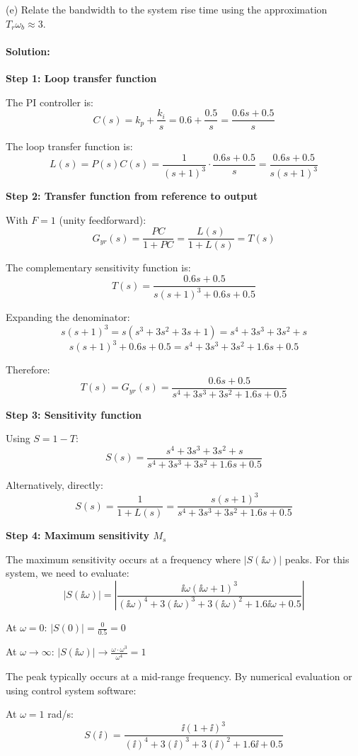 \documentclass[11pt,a4paper]{article}
\begin{document}
(e) Relate the bandwidth to the system rise time using the approximation $T_r \omega_b \approx 3$.

\paragraph{Solution:}

\textbf{Step 1: Loop transfer function}

The PI controller is:
\[
C(s) = k_p + \frac{k_i}{s} = 0.6 + \frac{0.5}{s} = \frac{0.6s + 0.5}{s}
\]

The loop transfer function is:
\[
L(s) = P(s)C(s) = \frac{1}{(s+1)^3} \cdot \frac{0.6s + 0.5}{s} = \frac{0.6s + 0.5}{s(s+1)^3}
\]

\textbf{Step 2: Transfer function from reference to output}

With $F = 1$ (unity feedforward):
\[
G_{yr}(s) = \frac{PC}{1+PC} = \frac{L(s)}{1+L(s)} = T(s)
\]

The complementary sensitivity function is:
\[
T(s) = \frac{0.6s + 0.5}{s(s+1)^3 + 0.6s + 0.5}
\]

Expanding the denominator:
\[
s(s+1)^3 = s(s^3 + 3s^2 + 3s + 1) = s^4 + 3s^3 + 3s^2 + s
\]
\[
s(s+1)^3 + 0.6s + 0.5 = s^4 + 3s^3 + 3s^2 + 1.6s + 0.5
\]

Therefore:
\[
T(s) = G_{yr}(s) = \frac{0.6s + 0.5}{s^4 + 3s^3 + 3s^2 + 1.6s + 0.5}
\]

\textbf{Step 3: Sensitivity function}

Using $S = 1 - T$:
\[
S(s) = \frac{s^4 + 3s^3 + 3s^2 + s}{s^4 + 3s^3 + 3s^2 + 1.6s + 0.5}
\]

Alternatively, directly:
\[
S(s) = \frac{1}{1+L(s)} = \frac{s(s+1)^3}{s^4 + 3s^3 + 3s^2 + 1.6s + 0.5}
\]

\textbf{Step 4: Maximum sensitivity $M_s$}

The maximum sensitivity occurs at a frequency where $|S(\ii\omega)|$ peaks. For this system, we need to evaluate:
\[
|S(\ii\omega)| = \left|\frac{\ii\omega(\ii\omega + 1)^3}{(\ii\omega)^4 + 3(\ii\omega)^3 + 3(\ii\omega)^2 + 1.6\ii\omega + 0.5}\right|
\]

At $\omega = 0$: $|S(0)| = \frac{0}{0.5} = 0$

At $\omega \to \infty$: $|S(\ii\omega)| \to \frac{\omega \cdot \omega^3}{\omega^4} = 1$

The peak typically occurs at a mid-range frequency. By numerical evaluation or using control system software:

At $\omega = 1$ rad/s:
\[
S(\ii) = \frac{\ii(1+\ii)^3}{(\ii)^4 + 3(\ii)^3 + 3(\ii)^2 + 1.6\ii + 0.5}
\]
\end{document}
